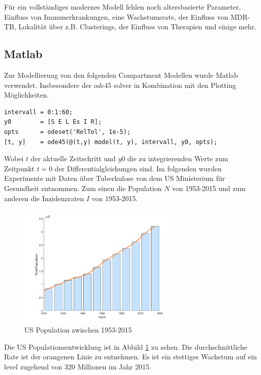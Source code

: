 \documentclass[paper=a4, fontsize=11pt, ngerman, abstract=on]{scrartcl}
\numberwithin{equation}{section} %
\numberwithin{figure}{section} %
\numberwithin{table}{section} %
\begin{document}
Für ein vollständiges modernes Modell fehlen noch altersbasierte Parameter, Einfluss von Immunerkrankungen, eine Wachstumsrate, der Einfluss von MDR-TB, Lokalität über z.B. Clusterings, der Einfluss von Therapien und einige mehr. \cite{MathOfInfectiousDiseases2000}

\subsection{Matlab}

Zur Modellierung von den folgenden Compartment Modellen wurde Matlab verwendet. Insbesondere der $ode45$ solver in Kombination mit den Plotting Möglichkeiten.

\begin{lstlisting}[style=matlab]
intervall = 0:1:60;
y0        = [S E L Es I R];
opts      = odeset('RelTol', 1e-5);
[t, y]    = ode45(@(t,y) model(t, y), intervall, y0, opts);
\end{lstlisting}

Wobei $t$ der aktuelle Zeitschritt und $y0$ die zu integrierenden Werte zum Zeitpunkt $t = 0$ der Differentialgleichungen sind. Im folgenden wurden Experimente mit Daten über Tuberkulose von dem US Ministerium für Gesundheit entnommen. Zum einen die Population $N$ von 1953-2015 und zum anderen die Inzidenzraten $I$ von 1953-2015.

\begin{figure}[ht]
  \centering
  \includegraphics[width=0.7\textwidth,keepaspectratio]{images/us-population}
  \caption{US Population zwischen 1953-2015}
  \label{fig:us-population}
\end{figure}

Die US Populationsentwicklung ist in Abbild \ref{fig:us-population} zu sehen. Die durchschnittliche Rate ist der orangenen Linie zu entnehmen. Es ist ein stettiges Wachstum auf ein level zugehend von 320 Millionen im Jahr 2015.
\end{document}
